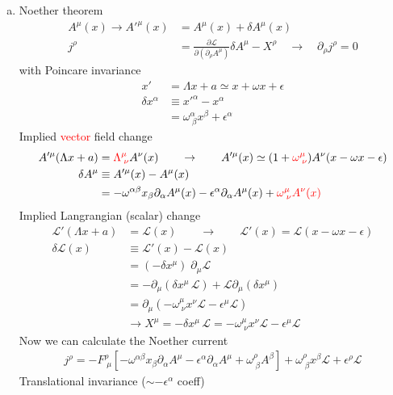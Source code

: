 \documentclass[10pt,a4paper]{report}
\theoremstyle{definition}
\begin{document}
\begin{enumerate}[a)]
\item Noether theorem 
\begin{align}
A^\mu(x)\rightarrow A'^\mu(x)
&=A^\mu(x)+\delta A^\mu(x)\\
j^\rho
&=\frac{\partial\mathcal{L}}{\partial(\partial_\rho A^\mu)}\delta A^\mu-X^\rho
\quad\rightarrow\quad
\partial_\rho j^\rho=0
\end{align}
with Poincare invariance
\begin{align}
x'&=\Lambda x+a\simeq x+\omega x+\epsilon\\
\delta x^\alpha&\equiv x'^\alpha-x^\alpha\\
&=\omega^\alpha_{\;\beta}x^\beta+\epsilon^\alpha
\end{align}
Implied \textcolor{red}{vector} field change
\begin{align}
A'^\mu(\Lambda x+a)&=\textcolor{red}{\Lambda^\mu_{\;\nu}}A^\nu(x)\qquad\rightarrow\qquad A'^\mu(x)\simeq (1+\textcolor{red}{\omega^\mu_{\;\nu}})A^\nu(x-\omega x-\epsilon)\\
\delta A^\mu
&\equiv A'^\mu(x)-A^\mu(x)\\
&=-\omega^{\alpha\beta}x_\beta\partial_\alpha A^\mu(x)-\epsilon^\alpha\partial_\alpha A^\mu(x)+\textcolor{red}{\omega^\mu_{\;\nu}A^\nu(x)}
\end{align}
Implied Langrangian (scalar) change
\begin{align}
\mathcal{L}'(\Lambda x+a)
&=\mathcal{L}(x)\qquad\rightarrow\qquad\mathcal{L}'(x)=\mathcal{L}(x-\omega x-\epsilon)\\
\delta\mathcal{L}(x)
&\equiv\mathcal{L}'(x)-\mathcal{L}(x)\\
&=(-\delta x^\mu)\;\partial_\mu\mathcal{L}\\
&=-\partial_\mu(\delta x^\mu\,\mathcal{L})+\mathcal{L}\partial_\mu(\delta x^\mu)\\
&=\partial_\mu(-\omega^\mu_{\;\nu} x^\nu\mathcal{L}-\epsilon^\mu \mathcal{L})\\
&\rightarrow X^\mu=-\delta x^\mu\,\mathcal{L}=-\omega^\mu_{\;\nu} x^\nu\mathcal{L}-\epsilon^\mu \mathcal{L}
\end{align}
Now we can calculate the Noether current
\begin{align}
j^\rho=-F^\rho_{\;\mu}\left[-\omega^{\alpha\beta}x_\beta\partial_\alpha A^\mu-\epsilon^\alpha\partial_\alpha A^\mu+\omega^\rho_{\;\beta}A^\beta\right]+\omega^\rho_{\;\beta} x^\beta\mathcal{L}+\epsilon^\rho \mathcal{L}
\end{align}
Translational invariance ($\sim-\epsilon^\alpha$ coeff)
\begin{align}

\end{align}
\end{enumerate}
\end{document}
